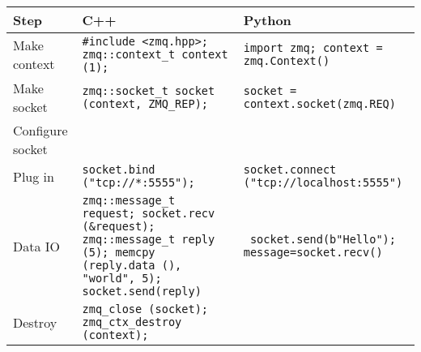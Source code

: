 \documentclass[preview,border={30 30 30 30}]{standalone}
\begin{document}
\begin{tabular}{p{1.5cm}|p{4.5cm}|p{4.5cm}}
    Step             & C++ & Python \\\hline
    Make context     & \texttt{\#include <zmq.hpp>; zmq::context\_t context (1);} & \texttt{import zmq; context = zmq.Context()}\\\hline
    Make socket      & \texttt{zmq::socket\_t socket (context, ZMQ\_REP);} & \texttt{socket = context.socket(zmq.REQ)}\\\hline
    Configure socket & \\\hline
    Plug in          & \texttt{socket.bind ("tcp://*:5555");} & \texttt{socket.connect
    ("tcp://localhost:5555")
}\\\hline
    Data IO &  \texttt{zmq::message\_t request; socket.recv (\&request); zmq::message\_t reply (5); memcpy (reply.data (), "world", 5); socket.send(reply)}& \texttt{    socket.send(b"Hello"); message=socket.recv()} \\\hline
    Destroy & \texttt{zmq\_close (socket);
    zmq\_ctx\_destroy (context);} \\\hline
\end{tabular}
\end{document}
